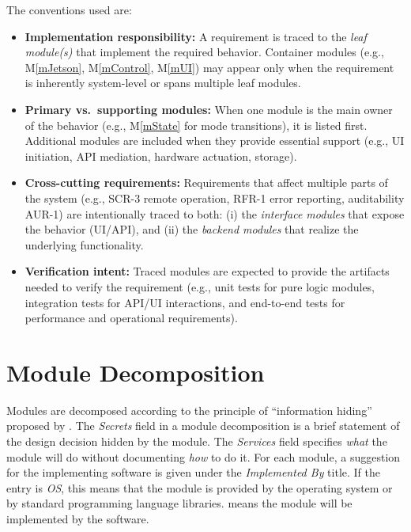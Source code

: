 \documentclass[12pt, titlepage]{article}
\newcommand{\mref}[1]{M\ref{#1}}
\begin{document}
The conventions used are:

\begin{itemize}
  \item \textbf{Implementation responsibility:} A requirement is traced to the
        \emph{leaf module(s)} that implement the required behavior. Container
        modules (e.g., \mref{mJetson}, \mref{mControl}, \mref{mUI}) may appear
        only when the requirement is inherently system-level or spans multiple
        leaf modules.

  \item \textbf{Primary vs.\ supporting modules:} When one module is the main
        owner of the behavior (e.g., \mref{mState} for mode transitions), it is
        listed first. Additional modules are included when they provide
        essential support (e.g., UI initiation, API mediation, hardware
        actuation, storage).

  \item \textbf{Cross-cutting requirements:} Requirements that affect multiple
        parts of the system (e.g., SCR-3 remote operation, RFR-1 error reporting,
        auditability AUR-1) are intentionally traced to both:
        (i) the \emph{interface modules} that expose the behavior (UI/API), and
        (ii) the \emph{backend modules} that realize the underlying functionality.

  \item \textbf{Verification intent:} Traced modules are expected to provide
        the artifacts needed to verify the requirement (e.g., unit tests for
        pure logic modules, integration tests for API/UI interactions, and
        end-to-end tests for performance and operational requirements).

\end{itemize}

\section{Module Decomposition} \label{SecMD}

Modules are decomposed according to the principle of ``information hiding''
proposed by \citet{ParnasEtAl1984}. The \emph{Secrets} field in a module
decomposition is a brief statement of the design decision hidden by the module.
The \emph{Services} field specifies \emph{what} the module will do without
documenting \emph{how} to do it. For each module, a suggestion for the
implementing software is given under the \emph{Implemented By} title. If the
entry is \emph{OS}, this means that the module is provided by the operating
system or by standard programming language libraries. \emph{\progname{}} means
the module will be implemented by the \progname{} software.
\end{document}
